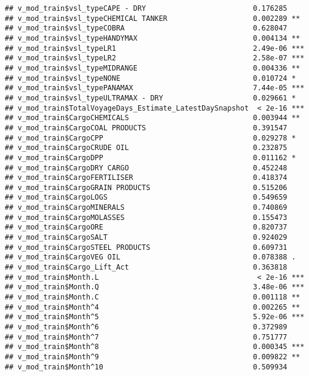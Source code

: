 \documentclass[]{article}
\begin{document}
\begin{verbatim}
## v_mod_train$vsl_typeCAPE - DRY                         0.176285    
## v_mod_train$vsl_typeCHEMICAL TANKER                    0.002289 ** 
## v_mod_train$vsl_typeCOBRA                              0.628047    
## v_mod_train$vsl_typeHANDYMAX                           0.004134 ** 
## v_mod_train$vsl_typeLR1                                2.49e-06 ***
## v_mod_train$vsl_typeLR2                                2.58e-07 ***
## v_mod_train$vsl_typeMIDRANGE                           0.004336 ** 
## v_mod_train$vsl_typeNONE                               0.010724 *  
## v_mod_train$vsl_typePANAMAX                            7.44e-05 ***
## v_mod_train$vsl_typeULTRAMAX - DRY                     0.029661 *  
## v_mod_train$TotalVoyageDays_Estimate_LatestDaySnapshot  < 2e-16 ***
## v_mod_train$CargoCHEMICALS                             0.003944 ** 
## v_mod_train$CargoCOAL PRODUCTS                         0.391547    
## v_mod_train$CargoCPP                                   0.029278 *  
## v_mod_train$CargoCRUDE OIL                             0.232875    
## v_mod_train$CargoDPP                                   0.011162 *  
## v_mod_train$CargoDRY CARGO                             0.452248    
## v_mod_train$CargoFERTILISER                            0.418374    
## v_mod_train$CargoGRAIN PRODUCTS                        0.515206    
## v_mod_train$CargoLOGS                                  0.549659    
## v_mod_train$CargoMINERALS                              0.740869    
## v_mod_train$CargoMOLASSES                              0.155473    
## v_mod_train$CargoORE                                   0.820737    
## v_mod_train$CargoSALT                                  0.924029    
## v_mod_train$CargoSTEEL PRODUCTS                        0.609731    
## v_mod_train$CargoVEG OIL                               0.078388 .  
## v_mod_train$Cargo_Lift_Act                             0.363818    
## v_mod_train$Month.L                                     < 2e-16 ***
## v_mod_train$Month.Q                                    3.48e-06 ***
## v_mod_train$Month.C                                    0.001118 ** 
## v_mod_train$Month^4                                    0.002265 ** 
## v_mod_train$Month^5                                    5.92e-06 ***
## v_mod_train$Month^6                                    0.372989    
## v_mod_train$Month^7                                    0.751777    
## v_mod_train$Month^8                                    0.000345 ***
## v_mod_train$Month^9                                    0.009822 ** 
## v_mod_train$Month^10                                   0.509934    

\end{verbatim}
\end{document}
